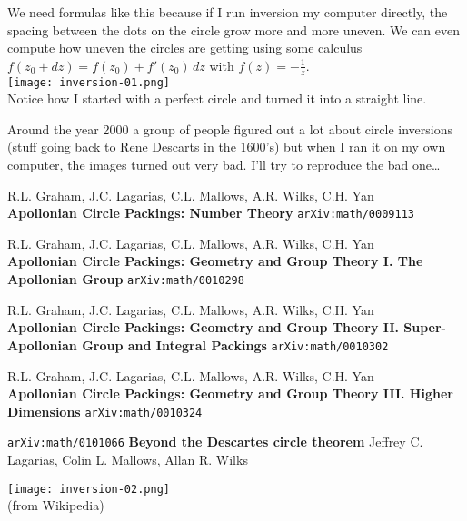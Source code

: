 \documentclass[12pt]{article}
\begin{document}
We need formulas like this because if I run inversion my computer directly, the spacing between the dots on the circle grow more and more uneven.  We can even compute how uneven the circles are getting using some calculus $f(z_0+dz) = f(z_0) + f'(z_0) \, dz$ with $f(z) = - \frac{1}{z}$. \\ 
\texttt{[image: inversion-01.png]} \\
Notice how I started with a perfect circle and turned it into a straight line. 

\newpage

\noindent Around the year 2000 a group of people figured out a lot about circle inversions (stuff going back to Rene Descarts in the 1600's) but when I ran it on my own computer, the images turned out very bad.  I'll try to reproduce the bad one\dots 

\begin{thebibliography}{}

\item R.L. Graham, J.C. Lagarias, C.L. Mallows, A.R. Wilks, C.H. Yan \\
 \textbf{Apollonian Circle Packings: Number Theory} \texttt{arXiv:math/0009113}
 
\item R.L. Graham, J.C. Lagarias, C.L. Mallows, A.R. Wilks, C.H. Yan \\
\textbf{Apollonian Circle Packings: Geometry and Group Theory I. The Apollonian Group}
 \texttt{arXiv:math/0010298} 

\item R.L. Graham, J.C. Lagarias, C.L. Mallows, A.R. Wilks, C.H. Yan \\
\textbf{Apollonian Circle Packings: Geometry and Group Theory II. Super-Apollonian Group and Integral Packings}
\texttt{arXiv:math/0010302}


\item R.L. Graham, J.C. Lagarias, C.L. Mallows, A.R. Wilks, C.H. Yan \\
\textbf{Apollonian Circle Packings: Geometry and Group Theory III. Higher Dimensions}
\texttt{arXiv:math/0010324} 

\item \texttt{arXiv:math/0101066} 
\textbf{Beyond the Descartes circle theorem}
Jeffrey C. Lagarias, Colin L. Mallows, Allan R. Wilks

\end{thebibliography}

\texttt{[image: inversion-02.png]} \\ 
(from Wikipedia)
\end{document}
